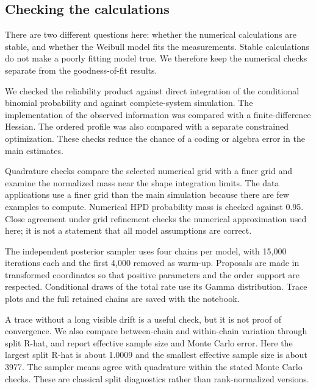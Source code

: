 \subsection{Checking the calculations}\label{sec:checks}
There are two different questions here: whether the numerical calculations are stable, and whether the Weibull model fits the measurements. Stable calculations do not make a poorly fitting model true. We therefore keep the numerical checks separate from the goodness-of-fit results.

We checked the reliability product against direct integration of the conditional binomial probability and against complete-system simulation. The implementation of the observed information was compared with a finite-difference Hessian. The ordered profile was also compared with a separate constrained optimization. These checks reduce the chance of a coding or algebra error in the main estimates.

Quadrature checks compare the selected numerical grid with a finer grid and examine the normalized mass near the shape integration limits. The data applications use a finer grid than the main simulation because there are few examples to compute. Numerical HPD probability mass is checked against 0.95. Close agreement under grid refinement checks the numerical approximation used here; it is not a statement that all model assumptions are correct.



The independent posterior sampler uses four chains per model, with 15,000 iterations each and the first 4,000 removed as warm-up. Proposals are made in transformed coordinates so that positive parameters and the order support are respected. Conditional draws of the total rate use its Gamma distribution. Trace plots and the full retained chains are saved with the notebook.



A trace without a long visible drift is a useful check, but it is not proof of convergence. We also compare between-chain and within-chain variation through split R-hat, and report effective sample size and Monte Carlo error. Here the largest split R-hat is about 1.0009 and the smallest effective sample size is about 3977. The sampler means agree with quadrature within the stated Monte Carlo checks. These are classical split diagnostics rather than rank-normalized versions.
